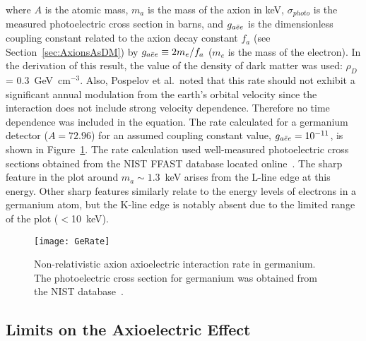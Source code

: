where $A$ is the atomic mass, $m_{a}$ is the mass of the axion in keV, $\sigma_{photo}$ is the measured photoelectric cross section in barns, and $g_{a\bar{e}e}$ is the dimensionless coupling constant related to the axion decay constant $f_{a}$ (see Section~\ref{sec:AxionsAsDM}) by $g_{a\bar{e}e} \equiv 2 m_{e}/ f_{a}$ ($m_{e}$ is the mass of the electron).  In the derivation of this result, the value of the density of dark matter was used: $\rho_{D}$ = 0.3~GeV~cm$^{-3}$.  Also, Pospelov et al.~noted that this rate should not exhibit a significant annual modulation from the earth's orbital velocity since the interaction does not include strong velocity dependence.  Therefore no time dependence was included in the equation.  The rate calculated for a germanium detector ($A=72.96$) for an assumed coupling constant value, $g_{a\bar{e}e} = 10^{-11}$, is shown in Figure~\ref{fig:HeavyAxionSignalRate}.  The rate calculation used well-measured photoelectric cross sections obtained from the NIST FFAST database located online~\cite{chantler:597}.  The sharp feature in the plot around $m_{a}\sim1.3$~keV arises from the L-line edge at this energy.  Other sharp features similarly relate to the energy levels of electrons in a germanium atom, but the K-line edge is notably absent due to the limited range of the plot ($<$10~keV).  



		\begin{figure}
			\centering
			\texttt{[image: GeRate]}
			\caption[Axioelectric interaction rate in germanium]{Non-relativistic axion axioelectric 
			interaction rate in germanium.  The photoelectric cross section for germanium was obtained
			from the NIST database~\cite{chantler:597}.}
			\label{fig:HeavyAxionSignalRate}
		\end{figure}

	\subsection{Limits on the Axioelectric Effect}
	\label{sec:CalcLimitsOnHeavyAxionLimits}		
		
